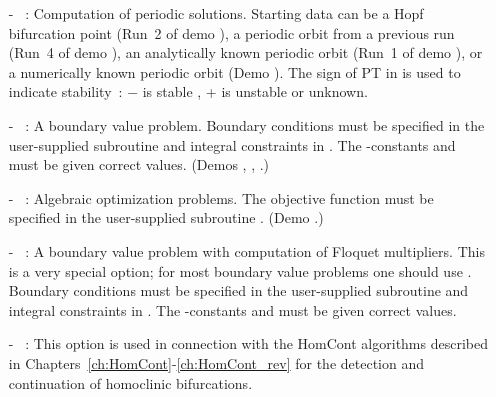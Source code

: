 \begin{itemize}
 (Demo .)
\item[-]  ~:
  Computation of periodic solutions. Starting data can be
  a Hopf bifurcation point (Run~2 of demo ),
  a periodic orbit from a previous run (Run~4 of demo ),
  an analytically known periodic orbit (Run~1 of demo ),
  or a numerically known periodic orbit (Demo ).
  The sign of PT in  is used to indicate
  stability~: $-$ is stable , + is unstable or unknown.
\item[-] ~: 
  A boundary value problem. Boundary conditions must be
  specified in the user-supplied subroutine 
  and integral constraints in . The \AUTO-constants
   and  must be given correct values.
 (Demos , , .)
\item[-] ~:
  Algebraic optimization problems. The objective function
  must be specified in the user-supplied subroutine . 
 (Demo .)
\item[-] ~:
  A boundary value problem with computation of Floquet multipliers. 
  This is a very special option; for most boundary value problems 
  one should use .
  Boundary conditions must be
  specified in the user-supplied subroutine 
  and integral constraints in . The \AUTO-constants
   and  must be given correct values.
\item[-] ~:
  This option is used in connection with the {\cal HomCont} algorithms
  described in 
  Chapters~\ref{ch:HomCont}-\ref{ch:HomCont_rev}
  for the  detection and continuation of homoclinic bifurcations.
  

\end{itemize}
